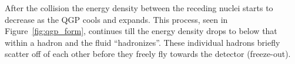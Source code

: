 
After the collision the energy density between the receding nuclei starts to decrease as the QGP cools and expands. This process, seen in Figure~\ref{fig:qgp_form}, continues till the energy density drops to below that within a hadron and the fluid ``hadronizes''. These individual hadrons briefly scatter off of each other before they freely fly towards the detector (freeze-out).



